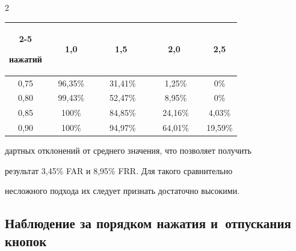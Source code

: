\begin{multicols}{2}
\begin{center}
{\begin{tabular}{|c|c|c|c|c|}
         \cline{2-5}

 нажатий& \ \ \ 1,0\ \ \  & \ \ \ 1,5 \ \ \  & \ \ \ 2,0 \ \ \   & 2,5     \\

                \hline

                    0,75 & 96,35\% & 31,41\% & \hphantom{9}1,25\%  & 0\%\hphantom{,99}  \\


                    0,80 & 99,43\% & 52,47\% & \hphantom{9}8,95\%  & 0\%\hphantom{,99} \\


                    0,85 & 100\%\hphantom{,999}   & 84,85\% & 24,16\% & 4,03\%  \\


                    0,90 & 100\%\hphantom{,999}   & 94,97\% & 64,01\% & 19,59\%\hphantom{9} \\

                                    \hline

                \end{tabular}

                }

            \end{center}




        \addtocounter{table}{2}

        

        \vspace*{6pt}





\noindent

дартных отклонений от среднего значения, что позволяет получить

результат 3,45\% FAR и 8,95\% FRR. Для такого сравнительно

несложного подхода их следует признать достаточно высокими.



\vspace*{-4pt}



\subsection {Наблюдение за порядком нажатия и~отпускания кнопок}




\end{multicols}
